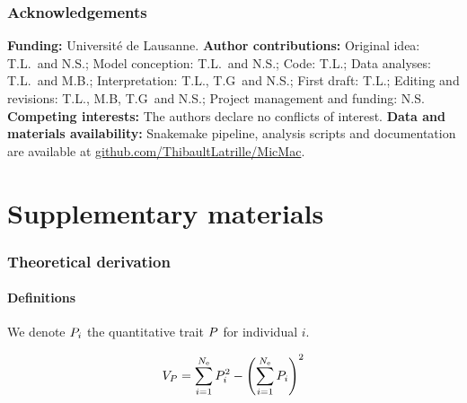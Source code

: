 \documentclass{article}
\begin{document}
\section*{Acknowledgements}
\label{sec:acknowledgment}
\textbf{Funding:}
Université de Lausanne.
\textbf{Author contributions:}
Original idea: T.L.\ and N.S.;
Model conception: T.L.\ and N.S.;
Code: T.L.;
Data analyses: T.L.\ and M.B.;
Interpretation: T.L., T.G\ and N.S.;
First draft: T.L.;
Editing and revisions: T.L., M.B, T.G\ and N.S.;
Project management and funding: N.S\@.
\textbf{Competing interests:}
The authors declare no conflicts of interest.
\textbf{Data and materials availability:}
Snakemake pipeline, analysis scripts and documentation are available at \href{https://github.com/ThibaultLatrille/MicMac}{github.com/ThibaultLatrille/MicMac}.

\printbibliography

\part*{Supplementary materials}

\section{Theoretical derivation}
\subsection{Definitions}

We denote $P_{i}$ the quantitative trait $P$ for individual $i$.

\begin{align}
    V_{P} = \sum_{i=1}^{N_{\text{e}}} P_{i}^2 - \left( \sum_{i=1}^{N_{\text{e}}} P_{i} \right)^2
\end{align}
\end{document}
